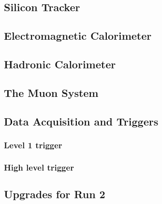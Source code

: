 \subsection{Silicon Tracker}

\subsection{Electromagnetic Calorimeter}

\subsection{Hadronic Calorimeter}

\subsection{The Muon System}

\subsection{Data Acquisition and Triggers}

\subsubsection{Level 1 trigger}

\subsubsection{High level trigger}

\subsection{Upgrades for Run 2}

